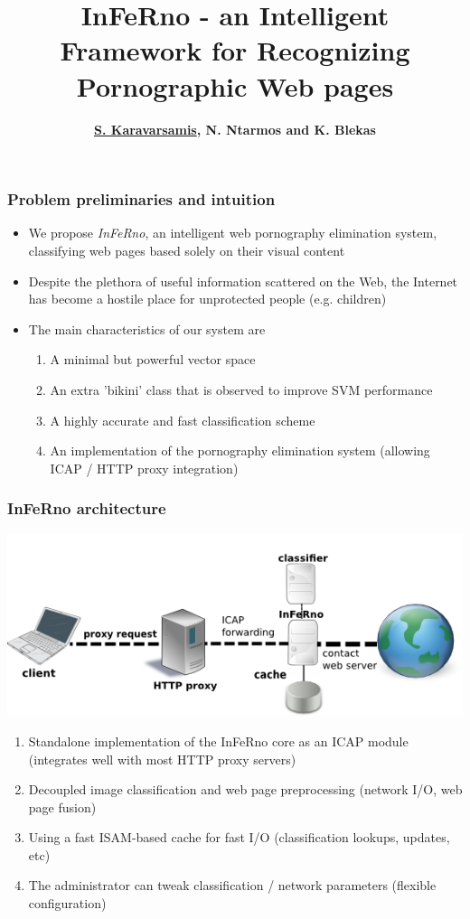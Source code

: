 \documentclass{beamer}
\title[ECML/PKDD 2011 demo session (demo \#10)]{InFeRno - an Intelligent Framework for Recognizing Pornographic Web pages}
\author{\bf{\underline{S. Karavarsamis}, N. Ntarmos and K. Blekas }}
\institute[UoI]
{\large
Department of Computer Science\\
University of Ioannina, Ioannina, Greeece \\
\medskip
{\normalsize E-mail: \{cs061205, ntarmos, kblekas\}@cs.uoi.gr}
}
\date{}
\begin{document}
\begin{frame}
\titlepage
\end{frame}

\begin{frame}
\frametitle{Problem preliminaries and intuition}

\begin{itemize}
	\item We propose \emph{InFeRno}, an intelligent web pornography elimination system, classifying web pages based solely on their visual content

	\item Despite the plethora of useful information scattered on the Web, the Internet has become a hostile place for unprotected people (e.g. children)

	\item The main characteristics of our system are
	\begin{enumerate}
		\item A minimal but powerful vector space
		\item An extra 'bikini' class that is observed to improve SVM performance
		\item A highly accurate and fast classification scheme
		\item An implementation of the pornography elimination system (allowing ICAP / HTTP proxy integration)
	\end{enumerate}
\end{itemize}

\end{frame}

\begin{frame}
\frametitle{InFeRno architecture}
\begin{center}
	\includegraphics[scale=0.6]{images/network_diagram.png}
	\begin{enumerate}
		\item Standalone implementation of the InFeRno core as an ICAP module (integrates well with most HTTP proxy servers)
		\item Decoupled image classification and web page preprocessing (network I/O, web page fusion)
		\item Using a fast ISAM-based cache for fast  I/O (classification lookups, updates, etc)
        \item The administrator can tweak classification / network parameters (flexible configuration)
	\end{enumerate}
\end{center}
\end{frame}
\end{document}
